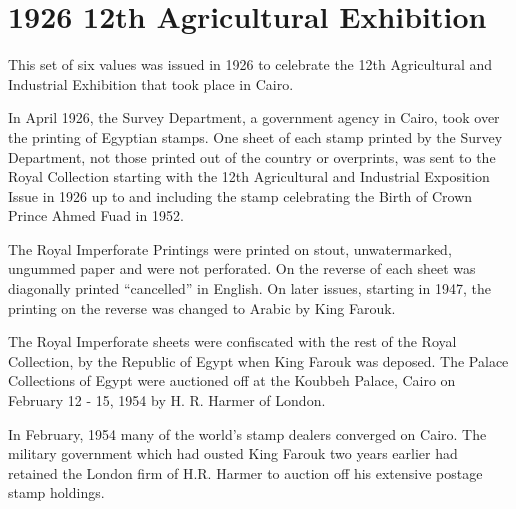 \documentclass[justified]{tufte-book}
\begin{document}















\newpage
\section{1926 12th Agricultural Exhibition}
\normalsize
This set of six values was issued in 1926 to celebrate the 12th Agricultural and Industrial Exhibition that took place in Cairo.

In April 1926, the Survey Department, a government agency in Cairo, took over the printing of Egyptian stamps. One sheet of each stamp printed by the Survey Department, not those printed out 
of the country or overprints, was sent to the Royal Collection starting with the 12th Agricultural and 
Industrial Exposition Issue in 1926 up to and including the stamp celebrating the Birth of Crown 
Prince Ahmed Fuad in 1952.   

The Royal Imperforate Printings were printed on stout, unwatermarked, ungummed paper and were not perforated.  On the reverse of each sheet was diagonally printed “cancelled” in English. On later 
issues, starting in 1947, the printing on the reverse was changed to Arabic by King Farouk.

The Royal Imperforate sheets were confiscated with the rest of the Royal Collection, by the Republic of Egypt when King Farouk was deposed.  The Palace Collections of Egypt were auctioned off at the 
Koubbeh Palace, Cairo on February 12 - 15, 1954 by H. R. Harmer of London.


In February, 1954 many of the world’s stamp dealers converged on Cairo.  The military government which had ousted King Farouk two years earlier had retained the London firm of H.R. Harmer to auction off his extensive postage stamp holdings.
\end{document}
